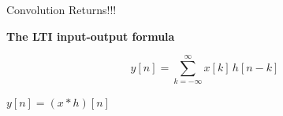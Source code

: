 \documentclass[aspectratio=169,11pt]{beamer}
\newcommand{\CardTitleSize}{\large}
\newcommand{\CardTitle}[1]{%
  \vspace{0.15cm}
  {\CardTitleSize\bfseries #1}\par
}
\begin{document}
\begin{frame}{Convolution Returns!!!}



\begin{center}
\begin{GreenCard}[
  width=0.86\textwidth,
  halign=center,
  top=14pt,
  bottom=14pt
]
\CardTitle{The LTI input-output formula}

\vspace{0.08cm}

{\LARGE
\[
y[n]=\sum_{k=-\infty}^{\infty}x[k]\,h[n-k]
\]
}

\vspace{0.10cm}

\begin{OrangeBox}[
  calloutshadedorange,
  halign=center,
  fontupper=\LARGE
]{}
\(\displaystyle y[n]=(x*h)[n]\)
\end{OrangeBox}



\end{GreenCard}
\end{center}

\end{frame}
\end{document}
